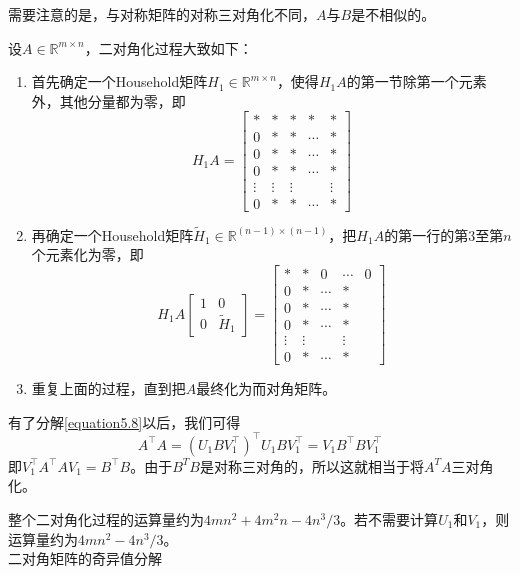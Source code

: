 \documentclass[12pt,a4paper]{article}
\begin{document}
需要注意的是，与对称矩阵的对称三对角化不同，$A$与$B$是不相似的。

设$A \in \mathbb{R}^{m \times n}$，二对角化过程大致如下：
\begin{enumerate}[(1)]
	\item 首先确定一个Household矩阵$H_1 \in \mathbb{R}^{m \times n}$，使得$H_1A$的第一节除第一个元素外，其他分量都为零，即$$H_1A=\left[\begin{array}{ccccc}{*} & {*} & {*} & {*} & {*} \\ {0} & {*} & {*} & {\cdots} & {*} \\ {0} & {*} & {*} & {\cdots} & {*} \\ {0} & {*} & {*} & {\cdots} & {*} \\ {\vdots} & {\vdots} & {\vdots} & {} & {\vdots} \\ {0} & {*} & {*} & {\cdots} & {*}\end{array}\right]$$
	\item 再确定一个Household矩阵$\tilde{H}_{1} \in \mathbb{R}^{(n-1) \times(n-1)}$，把$H_1A$的第一行的第$3$至第$n$个元素化为零，即$$
	H_{1} A\left[\begin{array}{cc}{1} & {0} \\ {0} & {\tilde{H}_{1}}\end{array}\right]=\left[\begin{array}{ccccc}{*} & {*} & {0} & {\cdots} & {0} \\ {0} & {*} & {\cdots} & {*} \\ {0} & {*} & {\cdots} & {*} \\ {0} & {*} & {\cdots} & {*} \\ {\vdots} & {\vdots} & {} & {\vdots} \\ {0} & {*} & {\cdots} & {*}\end{array}\right]
	$$
	\item 重复上面的过程，直到把$A$最终化为而对角矩阵。
\end{enumerate}

有了分解\ref{equation5.8}以后，我们可得$$
A^{\top} A=\left(U_{1} B V_{1}^{\top}\right)^{\top} U_{1} B V_{1}^{\top}=V_{1} B^{\top} B V_{1}^{\top}
$$即$V_{1}^{\top} A^{\top} A V_{1}=B^{\top} B$。由于$B^TB$是对称三对角的，所以这就相当于将$A^TA$三对角化。

整个二对角化过程的运算量约为$4mn^2+4m^2n-4n^3/3$。若不需要计算$U_1$和$V_1$，则运算量约为$4mn^2-4n^3/3$。\\
二对角矩阵的奇异值分解
\end{document}
